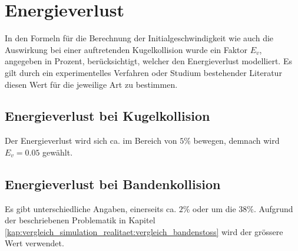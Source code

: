 \section{Energieverlust}
In den Formeln für die Berechnung der Initialgeschwindigkeit wie auch die Auswirkung bei einer auftretenden Kugelkollision
wurde ein Faktor $E_v$, angegeben in Prozent, berücksichtigt, welcher den Energieverlust modelliert.
Es gilt durch ein experimentelles Verfahren oder Studium bestehender Literatur diesen Wert für die jeweilige Art zu bestimmen.

\subsection{Energieverlust bei Kugelkollision}
Der Energieverlust wird sich ca. im Bereich von $5\%$\cite{unikoblenz:entwicklungvirtuellesbillarspiel} bewegen, demnach wird $E_v = 0.05$ gewählt.

\subsection{Energieverlust bei Bandenkollision}
Es gibt unterschiedliche Angaben, einerseits ca. $2\%$\cite{10.1243/09544062JMES1964} oder um die $38\%$\cite{billardaktuell:thescienceofpocketbillards}.
Aufgrund der beschriebenen Problematik in Kapitel \ref{kap:vergleich_simulation_realitaet:vergleich_bandenstoss} wird
der grössere Wert verwendet.